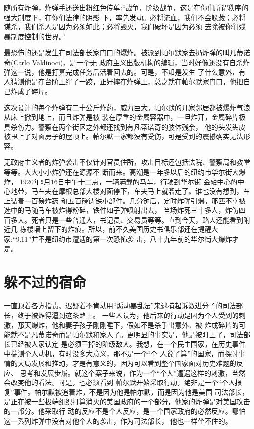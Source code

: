 \documentclass[10pt]{article}
\begin{document}
{随所有炸弹，炸弹手还送出粉红色传单:``战争，阶级战争，这是在你们所谓秩序的强大制度下，在你们法律的阴影
下，率先发动。必将流血，我们不会躲藏；必将谋杀，我们杀人是因为必须如此；必将毁灭，我们破坏是因为必须
去除被你们残暴制度控制的世界。''

最恐怖的还是发生在司法部长家门口的爆炸。被派到帕尔默家去扔炸弹的叫凡蒂诺奇(Carlo Valdinoci)，是一个无
政府主义出版机构的编辑，当时好像还没有自杀炸弹这一说，他是打算完成任务后活着回去的。可是，不知是发生
了什么意外，有人猜测他是在台阶上绊了一跤，正好摔在炸弹上，总之就在帕尔默家门口，他把自己炸成了碎片。

这次设计的每个炸弹有二十公斤炸药，威力巨大。帕尔默的几家邻居都被爆炸气浪从床上掀到地上，而且炸弹是被
装在厚重的金属容器中，一旦炸开，金属碎片极具杀伤力。警察在两个街区之外都还找到有凡蒂诺奇的肢体残余，
他的头发头皮被甩上了对面房子的屋顶上。帕尔默一家都没有受伤，可是受到的震撼确实无法形容。

无政府主义者的炸弹袭击不仅针对官员住所，攻击目标还包括法院、警察局和教堂等等。大大小小炸弹还在源源不
断而来。高潮是一年多以后的纽约市华尔街大爆炸， 1920年9月16日中午十二点，一辆满载的马车，行驶到华尔街
金融中心的中心地带，马车夫在摩根总部大楼对面停下，车夫马上就溜走了。谁也没有想到，车上装着一百磅炸药
和五百磅铸铁小部件。几分钟后，定时炸弹引爆，那匹不幸被选中的马随马车被炸得粉碎，铁件如子弹喷射出去，
当场炸死三十多人，炸伤四百多人。死者只是一些普通人，书记员、交易员等等。直到今天，路人还能看到附近几
栋楼墙上留下的炸痕。所以，前不久美国历史书俱乐部还在提醒大家:``9.11''并不是纽约市遭遇的第一次恐怖袭
击，八十九年前的华尔街大爆炸才是。

\pagebreak
\section{躲不过的宿命}

一直顶着各方指责、迟疑着不肯动用``煽动暴乱法''来逮捕起诉激进分子的司法部长，终于被炸得逼到这条路上。
一些人认为，他后来的行动是因为个人受到的刺激，那天爆炸，他和妻子孩子刚刚睡下，假如不是杀手出意外，被
炸成碎片的可能就不是凡蒂诺奇而是帕尔默和家人了。更明显的事实是，他是被盯上了，司法部长已经被人家认定
是必须干掉的阶级敌人。我想，在一个民主国家，在历史事件中揣测个人动机，有时没多大意义，那不是一个``个
人说了算''的国家，而探讨事情的大局发展和推动，才是有意义的，因为可以看到整个国家面对历史难题的反应、
思考和发展步履。就这个案子来说，作为一个``个人''遭遇这样的刺激，当然会改变他的看法。可是，也必须看到
帕尔默开始采取行动，绝非是一个``个人报复''事件。帕尔默被追着炸，不是因为他是帕尔默，而是因为他是美国
司法部长，是正在被一些极端组织打算消灭的美国政府的一个部分，他家的炸弹是对美国攻击的一部分。他采取行
动的反应不是个人反应，是一个国家政府的必然反应。哪怕这一系列炸弹中没有对他个人的袭击，作为司法部长，
他也一样坐不住的。

}
\end{document}
